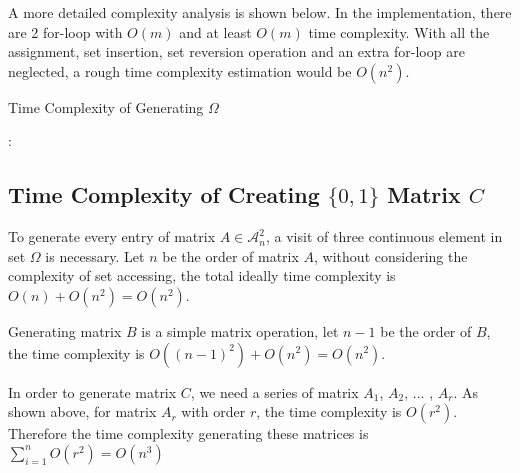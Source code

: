\documentclass[11pt]{article}
\begin{document}
A more detailed complexity analysis is shown below. In the implementation, there are 2 for-loop with $O(m)$ and at least $O(m)$ time complexity. With all the assignment, set insertion, set reversion operation and an extra for-loop are neglected, a rough time complexity estimation would be $O(n^2)$.

\begin{algorithm}[H] 
    \caption{Time Complexity of Generating $\Omega$}
    \label{alg:loop_tc}
    \begin{algorithmic}[1]
    \Ensure{$\Omega$}
         
                      
             
                 
                :
                     
                \EndIf
                 
                     
                \EndFor
            \EndFor
        \EndFor
        \State \Return {$\Omega$}
    \end{algorithmic}
\end{algorithm}

\subsection{Time Complexity of Creating $\{0, 1\}$ Matrix $C$}
To generate every entry of matrix $A \in \mathcal{A}_n^2$, a visit of three continuous element in set $\Omega$ is necessary. Let $n$ be the order of matrix $A$, without considering the complexity of set accessing, the total ideally time complexity is $O(n) + O(n^2) = O(n^2)$.

Generating matrix $B$ is a simple matrix operation, let $n - 1$ be the order of $B$, the time complexity is $O((n-1)^2) + O(n^2) = O(n^2)$.

In order to generate matrix $C$, we need a series of matrix $A_1$, $A_2$, ... , $A_r$. As shown above, for matrix $A_r$ with order $r$, the time complexity is $O(r^2)$. Therefore the time complexity generating these matrices is $\sum_{i=1}^{n}O(r^2) = O(n^3)$
\end{document}
